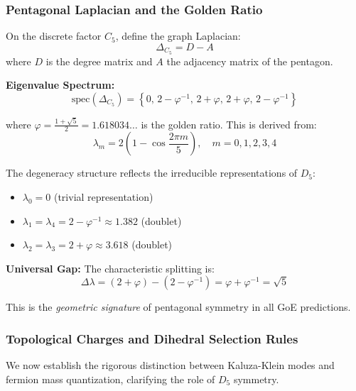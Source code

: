 \documentclass[12pt]{article}
\begin{document}
\subsubsection{Pentagonal Laplacian and the Golden Ratio}

On the discrete factor $C_5$, define the graph Laplacian:
\begin{equation}
\Delta_{C_5} = D - A
\end{equation}
where $D$ is the degree matrix and $A$ the adjacency matrix of the pentagon.

\textbf{Eigenvalue Spectrum:}
\begin{equation}
\boxed{\text{spec}(\Delta_{C_5}) = \left\{0,\, 2 - \varphi^{-1},\, 2 + \varphi,\, 2 + \varphi,\, 2 - \varphi^{-1}\right\}}
\end{equation}

where $\varphi = \frac{1+\sqrt{5}}{2} = 1.618034\ldots$ is the golden ratio. This is derived from:
\begin{equation}
\lambda_m = 2\left(1 - \cos\frac{2\pi m}{5}\right), \quad m = 0,1,2,3,4
\end{equation}

The degeneracy structure reflects the irreducible representations of $D_5$:
\begin{itemize}
\item $\lambda_0 = 0$ (trivial representation)
\item $\lambda_1 = \lambda_4 = 2 - \varphi^{-1} \approx 1.382$ (doublet)
\item $\lambda_2 = \lambda_3 = 2 + \varphi \approx 3.618$ (doublet)
\end{itemize}

\textbf{Universal Gap:} The characteristic splitting is:
\begin{equation}
\Delta\lambda = (2 + \varphi) - (2 - \varphi^{-1}) = \varphi + \varphi^{-1} = \sqrt{5}
\end{equation}

This is the \textit{geometric signature} of pentagonal symmetry in all GoE predictions.

\subsubsection{Topological Charges and Dihedral Selection Rules}
\label{sec:topological_charges}

We now establish the rigorous distinction between Kaluza-Klein modes and fermion mass quantization, clarifying the role of $D_5$ symmetry.
\end{document}
